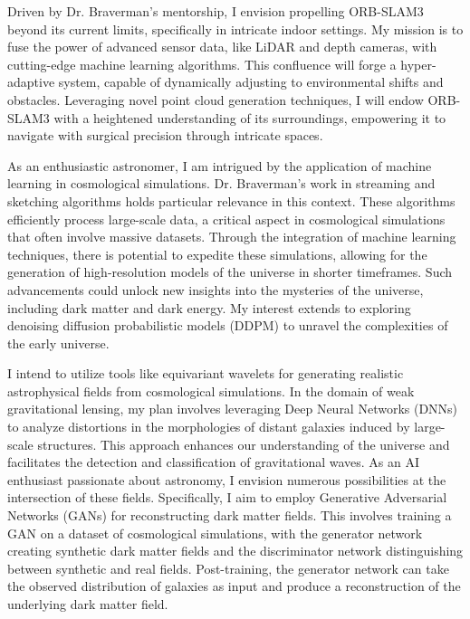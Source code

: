 \documentclass[a4,20pt]{article}
\begin{document}
\begin{large}
Driven by Dr. Braverman's mentorship, I envision propelling ORB-SLAM3 beyond its current limits, specifically in intricate indoor settings. My mission is to fuse the power of advanced sensor data, like LiDAR and depth cameras, with cutting-edge machine learning algorithms. This confluence will forge a hyper-adaptive system, capable of dynamically adjusting to environmental shifts and obstacles. Leveraging novel point cloud generation techniques, I will endow ORB-SLAM3 with a heightened understanding of its surroundings, empowering it to navigate with surgical precision through intricate spaces. 

As an enthusiastic astronomer, I am intrigued by the application of machine learning in cosmological simulations. Dr. Braverman's work in streaming and sketching algorithms holds particular relevance in this context. These algorithms efficiently process large-scale data, a critical aspect in cosmological simulations that often involve massive datasets. Through the integration of machine learning techniques, there is potential to expedite these simulations, allowing for the generation of high-resolution models of the universe in shorter timeframes. Such advancements could unlock new insights into the mysteries of the universe, including dark matter and dark energy. My interest extends to exploring denoising diffusion probabilistic models (DDPM) to unravel the complexities of the early universe. 

I intend to utilize tools like equivariant wavelets for generating realistic astrophysical fields from cosmological simulations. In the domain of weak gravitational lensing, my plan involves leveraging Deep Neural Networks (DNNs) to analyze distortions in the morphologies of distant galaxies induced by large-scale structures. This approach enhances our understanding of the universe and facilitates the detection and classification of gravitational waves. As an AI enthusiast passionate about astronomy, I envision numerous possibilities at the intersection of these fields. Specifically, I aim to employ Generative Adversarial Networks (GANs) for reconstructing dark matter fields. This involves training a GAN on a dataset of cosmological simulations, with the generator network creating synthetic dark matter fields and the discriminator network distinguishing between synthetic and real fields. Post-training, the generator network can take the observed distribution of galaxies as input and produce a reconstruction of the underlying dark matter field.


\end{large}
\end{document}

